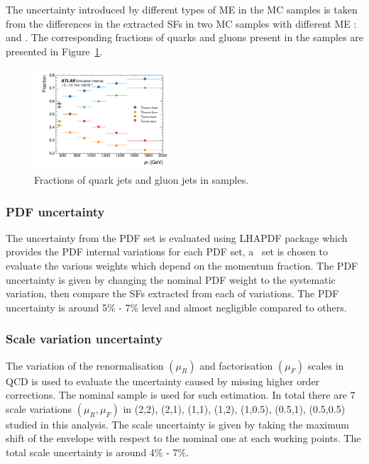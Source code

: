The  uncertainty introduced by different types of ME in the MC samples is taken from the differences in the extracted SFs in two MC samples with different ME : \powheg and \pythia. The corresponding fractions of quarks and gluons present in the \powheg samples are presented in Figure~\ref{fig:QG-pow-Frac}. 


\begin{figure}[htb]
	\centering
	\label{fig:QG-pow-Fmc}\includegraphics[width=0.45\textwidth]{fig/powhegpythia/plots/ADE/Fractions/none_event_weight/Fraction.pdf}
	\caption[]{
		Fractions of quark jets and gluon jets in \powheg samples. %
		\label{fig:QG-pow-Frac}
	}
\end{figure}

\FloatBarrier
    \subsubsection{PDF uncertainty}
  The uncertainty from the PDF set is evaluated using \textsc{LHAPDF} package which provides the PDF internal variations for each PDF set, a \nnpdftwo~set is chosen to evaluate the various weights which depend on the momentum fraction. The PDF uncertainty is given by changing the nominal PDF weight to the systematic variation, then compare the SFs extracted from each of variations. The PDF uncertainty is around 5\% - 7\% level and almost negligible compared to others.

  
    \subsubsection{Scale variation uncertainty}
  The variation of the renormalisation $(\mu_R)$ and factorisation $(\mu_F)$ scales in QCD is used to evaluate the uncertainty caused by missing higher order corrections. The nominal \pythia sample is used for such estimation. In total there are 7 scale variations
  $(\mu_R, \mu_F)$ in (2,2), (2,1), (1,1), (1,2), (1,0.5), (0.5,1), (0.5,0.5) studied in this analysis. The scale uncertainty is given by taking the maximum shift of the envelope with respect to the nominal one at each working points. The total scale uncertainty is around 4\% - 7\%. 

